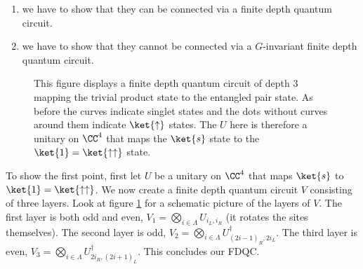 \begin{enumerate}
	\item we have to show that they can be connected via a finite depth quantum circuit.
	\item we have to show that they cannot be connected via a $G$-invariant finite depth quantum circuit.
\end{enumerate}
\begin{figure}
	\centering
	
	\caption{This figure displays a finite depth quantum circuit of depth 3 mapping the trivial product state to the entangled pair state. As before the curves indicate singlet states and the dots without curves around them indicate $\ket{\uparrow}$ states. The $U$ here is therefore a unitary on $\CC^4$ that maps the $\ket{s}$ state to the $\ket{1}=\ket{\uparrow\uparrow}$ state.}
	\label{fig:FakeAKLT_IsSRE}
\end{figure}
To show the first point, first let $U$ be a unitary on $\CC^4$ that maps $\ket{s}$ to $\ket{1}=\ket{\uparrow\uparrow}$. We now create a finite depth quantum circuit $V$ consisting of three layers. Look at figure \ref{fig:FakeAKLT_IsSRE} for a schematic picture of the layers of $V$. The first layer is both odd and even, $V_1=\bigotimes_{i\in\Lambda}U_{i_L,i_R}$ (it rotates the sites themselves). The second layer is odd, $V_2=\bigotimes_{i\in\Lambda}U_{(2i-1)_R,2i_L}^\dagger$. The third layer is even, $V_3=\bigotimes_{i\in\Lambda}U_{2i_R,(2i+1)_L}^\dagger$. This concludes our FDQC.
